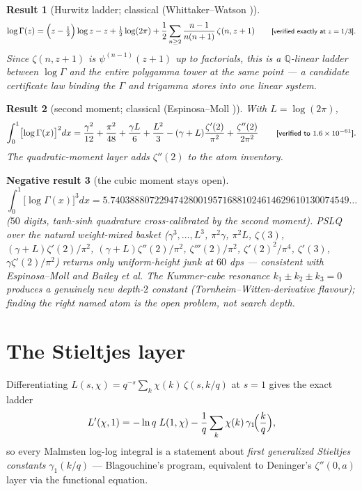 \documentclass[11pt]{article}
\newtheorem{result}{Result}[section]
\newtheorem{negative}[result]{Negative result}
\theoremstyle{remark}
\newcommand{\dps}[1]{\textsf{\footnotesize[#1]}}
\begin{document}
\begin{result}[Hurwitz ladder; classical (Whittaker--Watson \cite{WhittakerWatson})]\label{res:hurwitzladder}
\[
\log\Gamma(z)=\Bigl(z-\tfrac12\Bigr)\log z-z+\tfrac12\log(2\pi)
+\frac12\sum_{n\ge2}\frac{n-1}{n(n+1)}\,\zeta(n,z+1)
\qquad\text{\dps{verified exactly at $z=1/3$}}.
\]
Since $\zeta(n,z+1)$ is $\psi^{(n-1)}(z+1)$ up to factorials, this is a
$\mathbb{Q}$-linear ladder between $\log\Gamma$ and the \emph{entire polygamma tower at
the same point} --- a candidate certificate law binding the $\Gamma$ and trigamma stores
into one linear system.
\end{result}

\begin{result}[second moment; classical (Espinosa--Moll \cite{EspinosaMoll})]\label{res:em}
With $L=\log(2\pi)$,
\[
\int_0^1\bigl[\log\Gamma(x)\bigr]^2dx
=\frac{\gamma^2}{12}+\frac{\pi^2}{48}+\frac{\gamma L}{6}+\frac{L^2}{3}
-(\gamma+L)\frac{\zeta'(2)}{\pi^2}+\frac{\zeta''(2)}{2\pi^2}
\qquad\text{\dps{verified to $1.6\times10^{-61}$}}.
\]
The quadratic-moment layer adds $\zeta''(2)$ to the atom inventory.
\end{result}

\begin{negative}[the cubic moment stays open]\label{neg:cubic}
\[
\int_0^1\bigl[\log\Gamma(x)\bigr]^3dx
=5.7403888072294742800195716881024614629610130074549\ldots
\]
($50$ digits, tanh-sinh quadrature cross-calibrated by the second moment). PSLQ over the
natural weight-mixed basket ($\gamma^3,\dots,L^3$, $\pi^2\gamma$, $\pi^2L$,
$\zeta(3)$, $(\gamma{+}L)\zeta'(2)/\pi^2$, $(\gamma{+}L)\zeta''(2)/\pi^2$,
$\zeta'''(2)/\pi^2$, $\zeta'(2)^2/\pi^4$, $\zeta'(3)$, $\gamma\zeta'(2)/\pi^2$) returns
only uniform-height junk at $60$ dps --- consistent with Espinosa--Moll and Bailey et al.
The Kummer-cube resonance $k_1\pm k_2\pm k_3=0$ produces a genuinely new depth-$2$ constant
(Tornheim--Witten-derivative flavour); finding the right \emph{named} atom is the open
problem, not search depth.
\end{negative}

\section{The Stieltjes layer}\label{sec:stieltjes}

Differentiating $L(s,\chi)=q^{-s}\sum_k\chi(k)\,\zeta(s,k/q)$ at $s=1$ gives the exact
ladder
\[
L'(\chi,1)=-\ln q\;L(1,\chi)-\frac1q\sum_k\chi(k)\,\gamma_1\!\Bigl(\frac{k}{q}\Bigr),
\]
so every Malmsten log-log integral is a statement about \emph{first generalized Stieltjes
constants} $\gamma_1(k/q)$ --- Blagouchine's program, equivalent to Deninger's
$\zeta''(0,a)$ layer via the functional equation.
\end{document}
